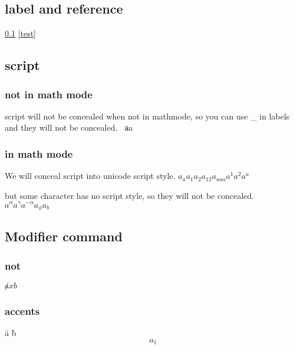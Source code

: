 \documentclass{ctexbook}
\begin{document}
\subsection{label and reference}
\label{test} \ref{test} \eqref{test} 

\subsection{script}
\subsubsection{not in math mode}
script will not be concealed when not in mathmode, so you can use \_ in labels and they will not be concealed.
\verb | a|a \alpha
\subsubsection{in math mode}
We will conceal script into unicode script style.
\(a_a a_1 a_2 a_{12} a_{aaa} a^1 a^2 a^a \)

but some character has no script style, so they will not be concealed.
\(a^\alpha a^\gamma a^{-\alpha} a_\phi a_b\)
\subsection{Modifier command}
\subsubsection{not}
\(\not ax b\)
\subsubsection{accents}
\"a \`b
\begin{equation}
  a_1
\end{equation}
\end{document}
